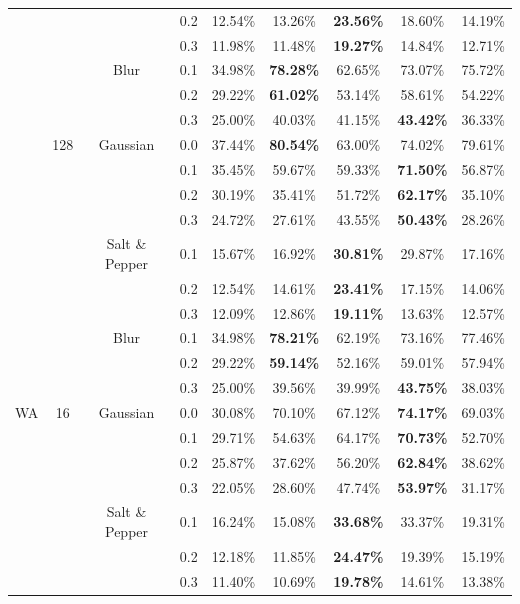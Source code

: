 \documentclass{article}
\begin{document}
\begin{table}[t]
\begin{center}
\begin{small}
\begin{tabular}{lcccccccc}
 &  &  & 0.2 & 12.54\% & 13.26\% & \textbf{23.56\%} & 18.60\% & 14.19\% \\
 &  &  & 0.3 & 11.98\% & 11.48\% & \textbf{19.27\%} & 14.84\% & 12.71\% \\
 &  & Blur & 0.1 & 34.98\% & \textbf{78.28\%} & 62.65\% & 73.07\% & 75.72\% \\
 &  &  & 0.2 & 29.22\% & \textbf{61.02\%} & 53.14\% & 58.61\% & 54.22\% \\
 &  &  & 0.3 & 25.00\% & 40.03\% & 41.15\% & \textbf{43.42\%} & 36.33\% \\
\midrule
 & 128 & Gaussian & 0.0 & 37.44\% & \textbf{80.54\%} & 63.00\% & 74.02\% & 79.61\% \\
 &  &  & 0.1 & 35.45\% & 59.67\% & 59.33\% & \textbf{71.50\%} & 56.87\% \\
 &  &  & 0.2 & 30.19\% & 35.41\% & 51.72\% & \textbf{62.17\%} & 35.10\% \\
 &  &  & 0.3 & 24.72\% & 27.61\% & 43.55\% & \textbf{50.43\%} & 28.26\% \\
 &  & Salt \& Pepper & 0.1 & 15.67\% & 16.92\% & \textbf{30.81\%} & 29.87\% & 17.16\% \\
 &  &  & 0.2 & 12.54\% & 14.61\% & \textbf{23.41\%} & 17.15\% & 14.06\% \\
 &  &  & 0.3 & 12.09\% & 12.86\% & \textbf{19.11\%} & 13.63\% & 12.57\% \\
 &  & Blur & 0.1 & 34.98\% & \textbf{78.21\%} & 62.19\% & 73.16\% & 77.46\% \\
 &  &  & 0.2 & 29.22\% & \textbf{59.14\%} & 52.16\% & 59.01\% & 57.94\% \\
 &  &  & 0.3 & 25.00\% & 39.56\% & 39.99\% & \textbf{43.75\%} & 38.03\% \\
\midrule\midrule
WA & 16 & Gaussian & 0.0 & 30.08\% & 70.10\% & 67.12\% & \textbf{74.17\%} & 69.03\% \\
 &  &  & 0.1 & 29.71\% & 54.63\% & 64.17\% & \textbf{70.73\%} & 52.70\% \\
 &  &  & 0.2 & 25.87\% & 37.62\% & 56.20\% & \textbf{62.84\%} & 38.62\% \\
 &  &  & 0.3 & 22.05\% & 28.60\% & 47.74\% & \textbf{53.97\%} & 31.17\% \\
 &  & Salt \& Pepper & 0.1 & 16.24\% & 15.08\% & \textbf{33.68\%} & 33.37\% & 19.31\% \\
 &  &  & 0.2 & 12.18\% & 11.85\% & \textbf{24.47\%} & 19.39\% & 15.19\% \\
 &  &  & 0.3 & 11.40\% & 10.69\% & \textbf{19.78\%} & 14.61\% & 13.38\% \\

\end{tabular}
\end{small}
\end{center}
\end{table}
\end{document}
